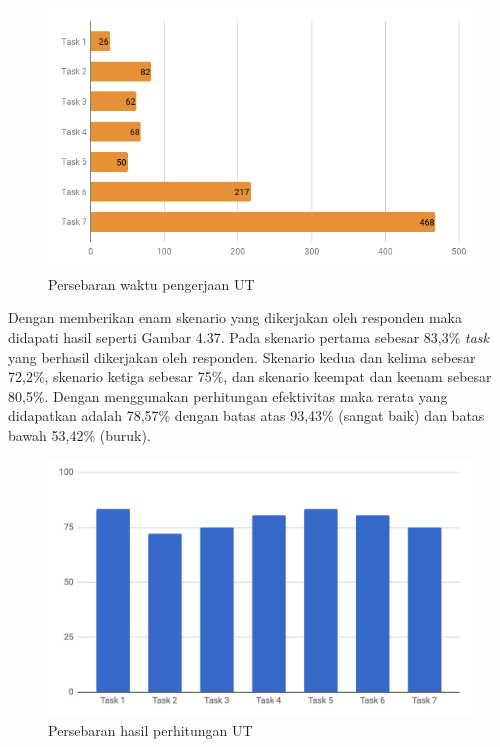 	\begin{figure}
		\centering
		\includegraphics[width=\linewidth]{pics/waktu-UT}
		\caption{Persebaran waktu pengerjaan UT}
	\end{figure}
	Dengan memberikan enam skenario yang dikerjakan oleh responden maka didapati hasil seperti Gambar 4.37. Pada skenario pertama sebesar 83,3\% \textit{task} yang berhasil dikerjakan oleh responden. Skenario kedua dan kelima sebesar 72,2\%, skenario ketiga sebesar 75\%, dan skenario keempat dan keenam sebesar 80,5\%. Dengan menggunakan perhitungan efektivitas maka rerata yang didapatkan adalah 78,57\% dengan batas atas 93,43\% (sangat baik) dan batas bawah 53,42\% (buruk).
	\begin{figure}
		\centering
		\includegraphics[width=\linewidth]{pics/persebaran-hasil-ut}
		\caption{Persebaran hasil perhitungan UT}
	\end{figure}
	

